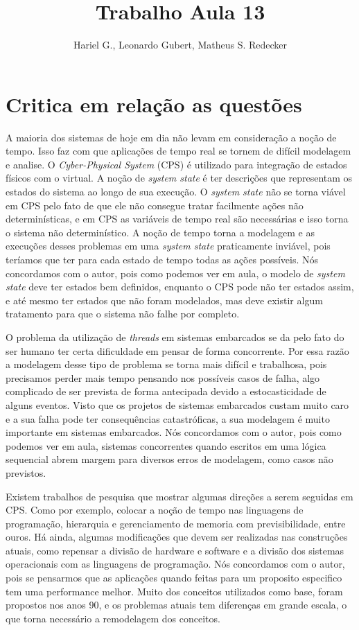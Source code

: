 \documentclass[12pt]{article}
\title{Trabalho Aula 13}
\author{Hariel G.\inst{1}, Leonardo Gubert\inst{1}, Matheus S. Redecker\inst{1}}
\begin{document}
 

\maketitle

\section{Critica em relação as questões}

A maioria dos sistemas de hoje em dia não levam em consideração a noção de tempo. Isso faz com que aplicações de tempo real se tornem de difícil modelagem e analise. O \textit{Cyber-Physical System} (CPS) é utilizado para integração de estados físicos com o virtual. A noção de \textit{system state} é ter descrições que representam os estados do sistema ao longo de sua execução. O \textit{system state} não se torna viável em CPS pelo fato de que ele não consegue tratar facilmente ações não determinísticas, e em CPS as variáveis de tempo real são necessárias e isso torna o sistema não determinístico. A noção de tempo torna a modelagem e as execuções desses problemas em uma \textit{system state} praticamente inviável, pois teríamos que ter para cada estado de tempo todas as ações possíveis. Nós concordamos com o autor, pois como podemos ver em aula, o modelo de \textit{system state} deve ter estados bem definidos, enquanto o CPS pode não ter estados assim, e até mesmo ter estados que não foram modelados, mas deve existir algum tratamento para que o sistema não falhe por completo.

O problema da utilização de \textit{threads} em sistemas embarcados se da pelo fato do ser humano ter certa dificuldade em pensar de forma concorrente. Por essa razão a modelagem desse tipo de problema se torna mais difícil e trabalhosa, pois precisamos perder mais tempo pensando nos possíveis casos de falha, algo complicado de ser prevista de forma antecipada devido a estocasticidade de alguns eventos. Visto que os projetos de sistemas embarcados custam muito caro e a sua falha pode ter consequências catastróficas, a sua modelagem é muito importante em sistemas embarcados. Nós concordamos com o autor, pois como podemos ver em aula, sistemas concorrentes quando escritos em uma lógica sequencial abrem margem para diversos erros de modelagem, como casos não previstos. 

Existem trabalhos de pesquisa que mostrar algumas direções a serem seguidas em CPS. Como por exemplo, colocar a noção de tempo nas linguagens de programação, hierarquia e gerenciamento de memoria com previsibilidade, entre ouros. Há ainda, algumas modificações que devem ser realizadas nas construções atuais, como repensar a divisão de hardware e software e a divisão dos sistemas operacionais com as linguagens de programação. Nós concordamos com o autor, pois se pensarmos que as aplicações quando feitas para um proposito especifico tem uma performance melhor. Muito dos conceitos utilizados como base, foram propostos nos anos 90, e os problemas atuais tem diferenças em grande escala, o que torna necessário a remodelagem dos conceitos.  
\end{document}

